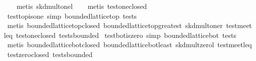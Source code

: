 \begin{isabellebody}
\ \ \isamarkupfalse%
\ {}metis\ skd{}mult{}onel{}\isanewline
\ \ \isamarkupfalse%
\ {}metis\ test{}one{}closed{}\isanewline
\ \ \isamarkupfalse%
%
\endisatagproof
{\isafoldproof}%
%
\isadelimproof
\isanewline
%
\endisadelimproof
\isanewline
{}\isamarkupfalse%
\ test{}top{}is{}one\ {}simp{}{}\ {}bounded{}lattice{}top\ tests\ {}\ {}{}\isanewline
%
\isadelimproof
\ \ %
\endisadelimproof
%
\isatagproof
{}\isamarkupfalse%
\ {}metis\ bounded{}lattice{}top{}closed\ bounded{}lattice{}top{}greatest\ skd{}mult{}oner\ test{}meet{}leq\ test{}one{}closed\ tests{}bounded{}%
\endisatagproof
{\isafoldproof}%
%
\isadelimproof
\isanewline
%
\endisadelimproof
\isanewline
{}\isamarkupfalse%
\ test{}bot{}is{}zero\ {}simp{}{}\ {}bounded{}lattice{}bot\ tests\ {}\ {}{}\isanewline
%
\isadelimproof
\ \ %
\endisadelimproof
%
\isatagproof
{}\isamarkupfalse%
\ {}metis\ bounded{}lattice{}bot{}closed\ bounded{}lattice{}bot{}least\ skd{}mult{}zerol\ test{}meet{}leq\ test{}zero{}closed\ tests{}bounded{}%

\end{isabellebody}
